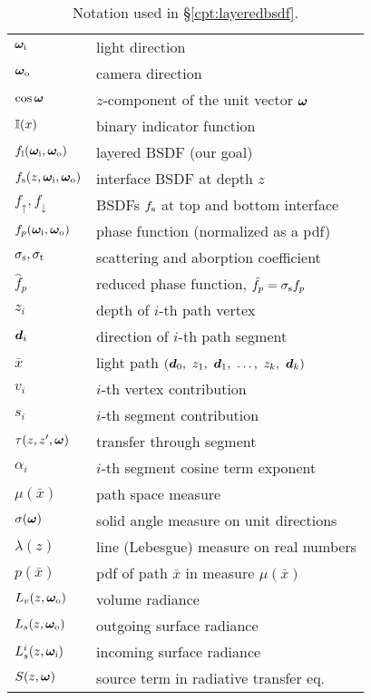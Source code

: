 \begin{table}[h]
	\centering
	\caption[Notation used in \S\ref{cpt:layeredbsdf}]{\label{tab:layeredbsdf:notation}
		Notation used in \S\ref{cpt:layeredbsdf}.
	}
	\renewcommand{\arraystretch}{1.1}
	\begin{tabular}{ll}
		$\bm\omega_\mathrm{i}$ & light direction \\
		$\bm\omega_\mathrm{o}$ & camera direction \\
		$\cos \bm\omega$ & $z$-component of the unit vector $\bm\omega$ \\
		$\mathbb{I}(x)$ & binary indicator function \\
		\hline
		
		$f_\mathrm{l}(\bm\omega_\mathrm{i}, \bm\omega_\mathrm{o})$ & layered BSDF (our goal) \\
		$f_\mathrm{s}(z, \bm\omega_\mathrm{i}, \bm\omega_\mathrm{o})$ & interface BSDF at depth $z$ \\
		$f_\uparrow, f_\downarrow$ & BSDFs $f_\mathrm{s}$ at top and bottom interface \\
		$f_p(\bm\omega_\mathrm{i}, \bm\omega_\mathrm{o})$ & phase function (normalized as a pdf) \\
		$\sigma_\mathrm{s}, \sigma_\mathrm{t}$ & scattering and aborption coefficient \\
		$\hat f_p$ & reduced phase function, $\hat f_p = \sigma_\mathrm{s} f_p$ \\
		\hline
		
		$z_i$ & depth of $i$-th path vertex \\
		$\bm{d}_i$ & direction of $i$-th path segment \\
		$\bar x$ & light path $(\bmd_0,\ z_1,\ \bmd_1,\ \dots,\ z_k,\ \bmd_k)$ \\
		$v_i$ & $i$-th vertex contribution \\
		$s_i$ & $i$-th segment contribution \\
		$\tau(z, z', \bm\omega)$ & transfer through segment \\
		$\alpha_i$ & $i$-th segment cosine term exponent \\
		$\mu(\bar x)$ & path space measure \\
		$\sigma(\bm\omega)$ & solid angle measure on unit directions \\
		$\lambda(z)$ & line (Lebesgue) measure on real numbers \\
		$p(\bar x)$ & pdf of path $\bar x$ in measure $\mu(\bar x)$ \\
		\hline
		
		$L_v(z, \bm\omega_\mathrm{o})$ & volume radiance \\
		$L_s(z, \bm\omega_\mathrm{o})$ & outgoing surface radiance \\
		$L^i_s(z, \bm\omega_\mathrm{i})$ & incoming surface radiance \\
		$S(z, \bm\omega)$ & source term in radiative transfer eq. \\
	\end{tabular}
\end{table}

